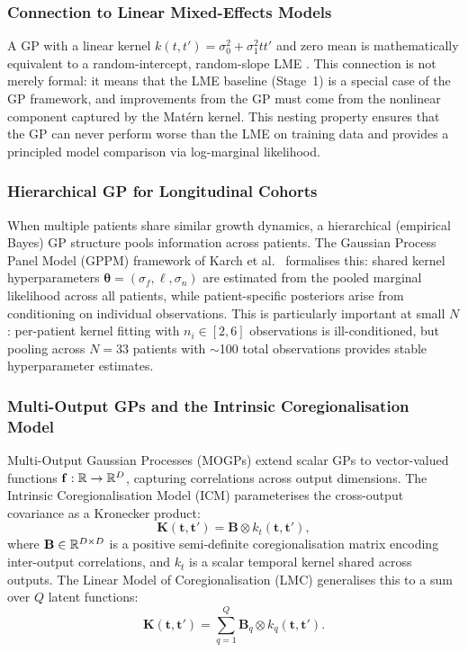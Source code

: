 \subsubsection{Connection to Linear Mixed-Effects Models}

A GP with a linear kernel $k(t, t') = \sigma_0^2 + \sigma_1^2 t t'$ and
zero mean is mathematically equivalent to a random-intercept, random-slope
LME \cite{rasmussen2006gaussian}. This connection is not merely formal:
it means that the LME baseline (Stage~1) is a special case of the GP
framework, and improvements from the GP must come from the nonlinear
component captured by the Mat\'{e}rn kernel. This nesting property ensures
that the GP can never perform worse than the LME on training data and
provides a principled model comparison via log-marginal likelihood.

\subsubsection{Hierarchical GP for Longitudinal Cohorts}

When multiple patients share similar growth dynamics, a hierarchical
(empirical Bayes) GP structure pools information across patients.
The Gaussian Process Panel Model (GPPM) framework of Karch et al.\
\cite{karch2020gppm} formalises this: shared kernel hyperparameters
$\boldsymbol{\theta} = (\sigma_f, \ell, \sigma_n)$ are estimated from the
pooled marginal likelihood across all patients, while patient-specific
posteriors arise from conditioning on individual observations. This is
particularly important at small $N$: per-patient kernel fitting with
$n_i \in [2, 6]$ observations is ill-conditioned, but pooling across
$N = 33$ patients with $\sim$100 total observations provides stable
hyperparameter estimates.

\subsubsection{Multi-Output GPs and the Intrinsic Coregionalisation Model}

Multi-Output Gaussian Processes (MOGPs) extend scalar GPs to vector-valued
functions $\mathbf{f}: \mathbb{R} \to \mathbb{R}^D$, capturing correlations across output
dimensions. The Intrinsic Coregionalisation Model (ICM) \cite{alvarez2012kernels}
parameterises the cross-output covariance as a Kronecker product:
\begin{equation}
  \mathbf{K}(\mathbf{t}, \mathbf{t}') =
    \mathbf{B} \otimes k_t(\mathbf{t}, \mathbf{t}'),
  \label{eq:icm}
\end{equation}
where $\mathbf{B} \in \mathbb{R}^{D \times D}$ is a positive semi-definite
coregionalisation matrix encoding inter-output correlations, and
$k_t$ is a scalar temporal kernel shared across outputs. The Linear Model of
Coregionalisation (LMC) generalises this to a sum over $Q$ latent functions:
\begin{equation}
  \mathbf{K}(\mathbf{t}, \mathbf{t}') =
    \sum_{q=1}^{Q} \mathbf{B}_q \otimes k_q(\mathbf{t}, \mathbf{t}').
  \label{eq:lmc}
\end{equation}

